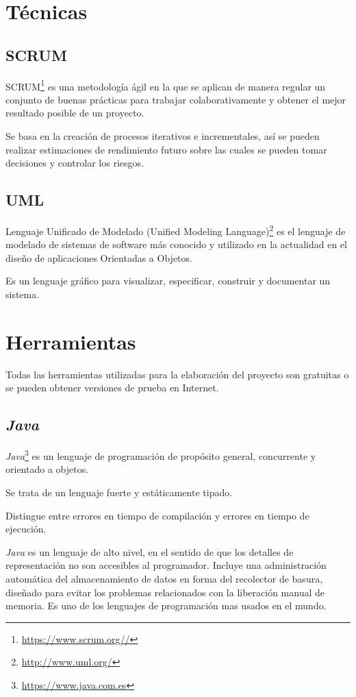 
\section{Técnicas}

\subsection{SCRUM}
SCRUM\footnote{\url{https://www.scrum.org//}} es una metodología ágil en la que se aplican de manera regular un conjunto de buenas prácticas para trabajar colaborativamente y obtener el mejor resultado posible de un proyecto.

Se basa en la creación de procesos iterativos e incrementales, así se pueden realizar estimaciones de rendimiento futuro sobre las cuales se pueden tomar decisiones y controlar los riesgos.
\subsection{UML}
Lenguaje Unificado de Modelado (Unified Modeling Language)\footnote{\url{http://www.uml.org/}} es el lenguaje de modelado de sistemas de software más conocido y utilizado en la actualidad en el diseño de aplicaciones Orientadas a Objetos.

Es un lenguaje gráfico para visualizar, especificar, construir y documentar un sistema.
\section{Herramientas}

Todas las herramientas utilizadas para la elaboración del proyecto son gratuitas o se pueden obtener versiones de prueba en Internet.

\subsection{\textit{Java}}
\textit{Java}\footnote{\url{https://www.java.com.es}} es un lenguaje de programación de propósito general, concurrente y orientado a objetos.

Se trata de un lenguaje fuerte y estáticamente tipado.

Distingue entre errores en tiempo de compilación y errores en tiempo de ejecución.

\textit{Java} es un lenguaje de alto nivel, en el sentido de que los detalles de representación no son accesibles al programador. 
Incluye una administración automática del almacenamiento de datos en forma del recolector de basura, diseñado para evitar los problemas relacionados con la liberación manual de memoria. Es uno de los lenguajes de programación mas usados en el mundo.

